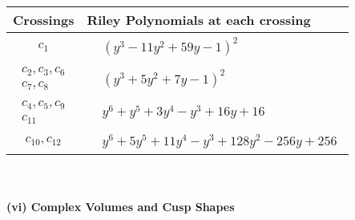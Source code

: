 \documentclass[1p]{elsarticle_modified}
\theoremstyle{definition}
\begin{document}
\begin{tabular}{m{50pt}|m{274pt}}
Crossings & \hspace{64pt}Riley Polynomials at each crossing \\
\hline $$\begin{aligned}c_{1}\end{aligned}$$&$\begin{aligned}
&(y^3-11 y^2+59 y-1)^2
\end{aligned}$\\
\hline $$\begin{aligned}c_{2},c_{3},c_{6}\\c_{7},c_{8}\end{aligned}$$&$\begin{aligned}
&(y^3+5 y^2+7 y-1)^2
\end{aligned}$\\
\hline $$\begin{aligned}c_{4},c_{5},c_{9}\\c_{11}\end{aligned}$$&$\begin{aligned}
&y^6+y^5+3 y^4- y^3+16 y+16
\end{aligned}$\\
\hline $$\begin{aligned}c_{10},c_{12}\end{aligned}$$&$\begin{aligned}
&y^6+5 y^5+11 y^4- y^3+128 y^2-256 y+256
\end{aligned}$\\
\hline
\end{tabular}\\~\\
\newpage\flushleft \textbf{(vi) Complex Volumes and Cusp Shapes}
\end{document}
